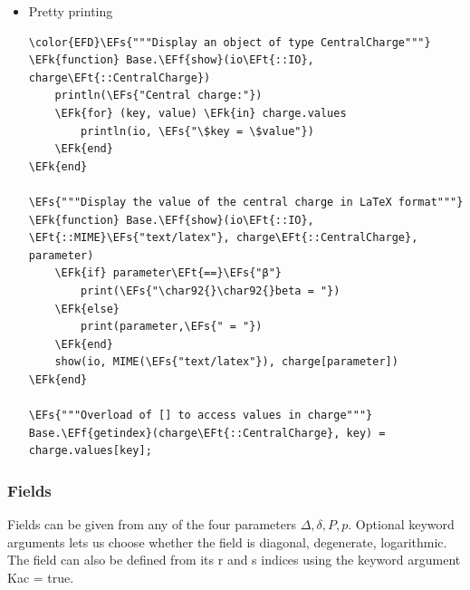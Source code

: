\documentclass[a4paper]{article}
\numberwithin{equation}{section}
\newcommand{\EFs}[1]{\textcolor{EFs}{#1}} %
\newcommand{\EFk}[1]{\textcolor{EFk}{#1}} %
\newcommand{\EFf}[1]{\textcolor{EFf}{#1}} %
\newcommand{\EFt}[1]{\textcolor{EFt}{#1}} %
\begin{document}
\begin{itemize}
\item Pretty printing
\label{sec:org62ab659}

\begin{Code}
\begin{Verbatim}
\color{EFD}\EFs{"""Display an object of type CentralCharge"""}
\EFk{function} Base.\EFf{show}(io\EFt{::IO}, charge\EFt{::CentralCharge})
    println(\EFs{"Central charge:"})
    \EFk{for} (key, value) \EFk{in} charge.values
        println(io, \EFs{"\$key = \$value"})
    \EFk{end}
\EFk{end}

\EFs{"""Display the value of the central charge in LaTeX format"""}
\EFk{function} Base.\EFf{show}(io\EFt{::IO}, \EFt{::MIME}\EFs{"text/latex"}, charge\EFt{::CentralCharge}, parameter)
    \EFk{if} parameter\EFt{==}\EFs{"β"}
        print(\EFs{"\char92{}\char92{}beta = "})
    \EFk{else}
        print(parameter,\EFs{" = "})
    \EFk{end}
    show(io, MIME(\EFs{"text/latex"}), charge[parameter])
\EFk{end}

\EFs{"""Overload of [] to access values in charge"""}
Base.\EFf{getindex}(charge\EFt{::CentralCharge}, key) = charge.values[key];
\end{Verbatim}
\end{Code}
\end{itemize}
\subsubsection*{Fields}
\label{sec:org8a5e52e}

Fields can be given from any of the four parameters \(\Delta, \delta, P, p\). Optional keyword arguments lets us choose whether the field is diagonal, degenerate, logarithmic. The field can also be defined from its r and s indices using the keyword argument Kac = true.
\end{document}
